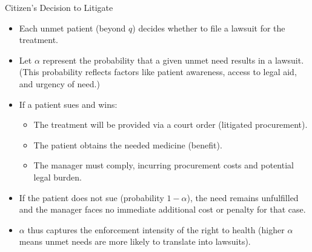 \documentclass{beamer}
\begin{document}
\begin{frame}{Citizen’s Decision to Litigate}
\begin{itemize}
  \item Each unmet patient (beyond $q$) decides whether to file a lawsuit for the treatment.
  \item Let $\alpha$ represent the probability that a given unmet need results in a lawsuit. (This probability reflects factors like patient awareness, access to legal aid, and urgency of need.)
  \item If a patient sues and wins:
    \begin{itemize}
      \item The treatment will be provided via a court order (litigated procurement).
      \item The patient obtains the needed medicine (benefit).
      \item The manager must comply, incurring procurement costs and potential legal burden.
    \end{itemize}
  \item If the patient does not sue (probability $1-\alpha$), the need remains unfulfilled and the manager faces no immediate additional cost or penalty for that case.
  \item $\alpha$ thus captures the enforcement intensity of the right to health (higher $\alpha$ means unmet needs are more likely to translate into lawsuits).
\end{itemize}
\end{frame}
\end{document}
